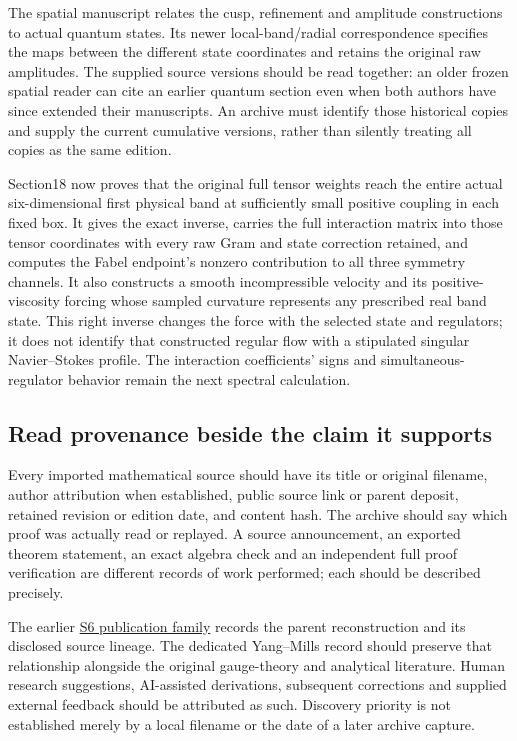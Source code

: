 The spatial manuscript relates the cusp, refinement and amplitude
constructions to actual quantum states. Its newer local-band/radial
correspondence specifies the maps between the different state
coordinates and retains the original raw amplitudes. The supplied source
versions should be read together: an older frozen spatial reader can
cite an earlier quantum section even when both authors have since
extended their manuscripts. An archive must identify those historical
copies and supply the current cumulative versions, rather than silently
treating all copies as the same edition.

Section18 now proves that the original full tensor weights reach the
entire actual six-dimensional first physical band at sufficiently small
positive coupling in each fixed box. It gives the exact inverse, carries
the full interaction matrix into those tensor coordinates with every raw
Gram and state correction retained, and computes the Fabel endpoint's
nonzero contribution to all three symmetry channels. It also constructs
a smooth incompressible velocity and its positive-viscosity forcing
whose sampled curvature represents any prescribed real band state. This
right inverse changes the force with the selected state and regulators;
it does not identify that constructed regular flow with a stipulated
singular Navier--Stokes profile. The interaction coefficients' signs and
simultaneous-regulator behavior remain the next spectral calculation.

\subsection{Read provenance beside the claim it
supports}\label{full-workbench-reading-map-md-read-provenance-beside-the-claim-it-supports}

Every imported mathematical source should have its title or original
filename, author attribution when established, public source link or
parent deposit, retained revision or edition date, and content hash. The
archive should say which proof was actually read or replayed. A source
announcement, an exported theorem statement, an exact algebra check and
an independent full proof verification are different records of work
performed; each should be described precisely.

The earlier \href{https://doi.org/10.5281/zenodo.22235523}{S6
publication family} records the parent reconstruction and its disclosed
source lineage. The dedicated Yang--Mills record should preserve that
relationship alongside the original gauge-theory and analytical
literature. Human research suggestions, AI-assisted derivations,
subsequent corrections and supplied external feedback should be
attributed as such. Discovery priority is not established merely by a
local filename or the date of a later archive capture.

